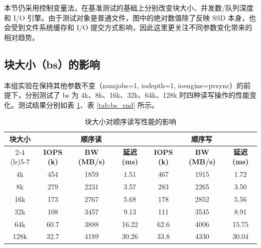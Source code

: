\documentclass[a4paper]{article}
\begin{document}
本节仍采用控制变量法，在基准测试的基础上分别改变块大小、并发数/队列深度和 I/O 引擎。由于测试对象是普通文件，图中的绝对数值除了反映 SSD 本身，也会受到文件系统缓存和 I/O 提交方式影响，因此这里更关注不同参数变化带来的相对趋势。

\subsection{块大小（bs）的影响}

本组实验在保持其他参数不变（numjobs=1, iodepth=1, ioengine=pvsync）的前提下，分别测试了 bs 为 4k、8k、16k、32k、64k、128k 时四种读写操作的性能变化。测试结果分别如表 \ref{tab:bs_seq}、表 \ref{tab:bs_rnd} 所示。

\begin{table}[H]
  \centering
  \small
  \renewcommand{\arraystretch}{1.25}
  \setlength{\tabcolsep}{6pt}
  \begin{tabular}{cccc ccc}
  \toprule
  \multirow{2}{*}{\textbf{块大小}} &
  \multicolumn{3}{c}{\textbf{顺序读}} &
  \multicolumn{3}{c}{\textbf{顺序写}} \\
  \cmidrule(lr){2-4} \cmidrule(lr){5-7}
   & \textbf{IOPS (k)} & \textbf{BW (MB/s)} & \textbf{延迟 (ms)}
   & \textbf{IOPS (k)} & \textbf{BW (MB/s)} & \textbf{延迟 (ms)} \\
  \midrule
  4k   & 454   & 1859  & 1.51  & 467   & 1915  & 1.72  \\
  8k   & 279   & 2231  & 3.57  & 283   & 2265  & 3.50  \\
  16k  & 173   & 2767  & 5.68  & 178   & 2852  & 5.56  \\
  32k  & 108   & 3457  & 9.13  & 111   & 3545  & 8.91  \\
  64k  & 60.7  & 3888  & 16.22 & 62.6  & 4006  & 15.75 \\
  128k & 32.7  & 4189  & 30.26 & 33.8  & 4330  & 30.04 \\
  \bottomrule
  \end{tabular}
  \caption{块大小对顺序读写性能的影响}
  \label{tab:bs_seq}
\end{table}
\end{document}
